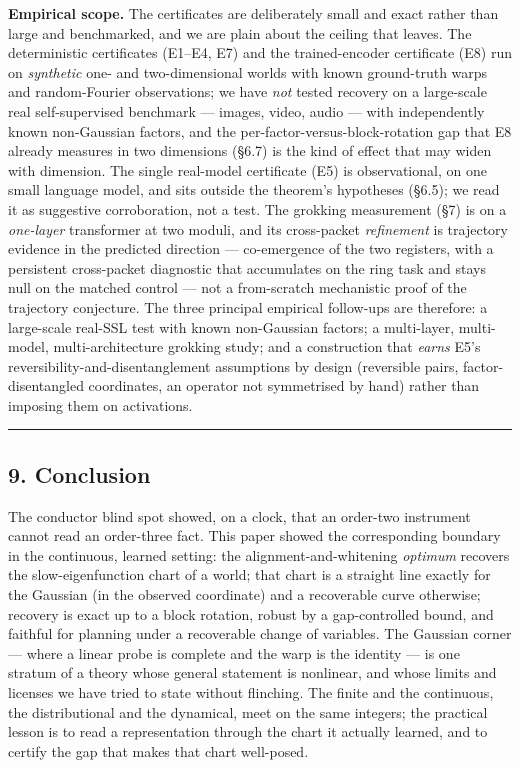 \documentclass[
  letterpaper,
  11pt]{article}
\theoremstyle{plain}
\theoremstyle{definition}
\theoremstyle{remark}
\begin{document}
\textbf{Empirical scope.} The certificates are deliberately small and exact rather than large and benchmarked, and we are plain about the ceiling that leaves. The deterministic certificates (E1--E4, E7) and the trained-encoder certificate (E8) run on \emph{synthetic} one- and two-dimensional worlds with known ground-truth warps and random-Fourier observations; we have \emph{not} tested recovery on a large-scale real self-supervised benchmark --- images, video, audio --- with independently known non-Gaussian factors, and the per-factor-versus-block-rotation gap that E8 already measures in two dimensions (§6.7) is the kind of effect that may widen with dimension. The single real-model certificate (E5) is observational, on one small language model, and sits outside the theorem's hypotheses (§6.5); we read it as suggestive corroboration, not a test. The grokking measurement (§7) is on a \emph{one-layer} transformer at two moduli, and its cross-packet \emph{refinement} is trajectory evidence in the predicted direction --- co-emergence of the two registers, with a persistent cross-packet diagnostic that accumulates on the ring task and stays null on the matched control --- not a from-scratch mechanistic proof of the trajectory conjecture. The three principal empirical follow-ups are therefore: a large-scale real-SSL test with known non-Gaussian factors; a multi-layer, multi-model, multi-architecture grokking study; and a construction that \emph{earns} E5's reversibility-and-disentanglement assumptions by design (reversible pairs, factor-disentangled coordinates, an operator not symmetrised by hand) rather than imposing them on activations.

\begin{center}\rule{0.5\linewidth}{0.5pt}\end{center}

\subsection{9. Conclusion}\label{sec:conclusion}

The conductor blind spot showed, on a clock, that an order-two instrument cannot read an order-three fact. This paper showed the corresponding boundary in the continuous, learned setting: the alignment-and-whitening \emph{optimum} recovers the slow-eigenfunction chart of a world; that chart is a straight line exactly for the Gaussian (in the observed coordinate) and a recoverable curve otherwise; recovery is exact up to a block rotation, robust by a gap-controlled bound, and faithful for planning under a recoverable change of variables. The Gaussian corner --- where a linear probe is complete and the warp is the identity --- is one stratum of a theory whose general statement is nonlinear, and whose limits and licenses we have tried to state without flinching. The finite and the continuous, the distributional and the dynamical, meet on the same integers; the practical lesson is to read a representation through the chart it actually learned, and to certify the gap that makes that chart well-posed.
\end{document}
